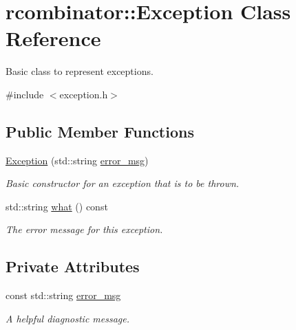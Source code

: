 \hypertarget{classrcombinator_1_1Exception}{}\section{rcombinator\+:\+:Exception Class Reference}
\label{classrcombinator_1_1Exception}


Basic class to represent exceptions.  




{\ttfamily \#include $<$exception.\+h$>$}

\subsection*{Public Member Functions}
\begin{DoxyCompactItemize}
\item 
\mbox{\hyperlink{classrcombinator_1_1Exception_a7d3c8825d7c2d7d1d8c9c537725734de}{Exception}} (std\+::string \mbox{\hyperlink{classrcombinator_1_1Exception_a982a342c7c75134b7323ecd67e43e13d}{error\+\_\+msg}})
\begin{DoxyCompactList}\small\item\em Basic constructor for an exception that is to be thrown. \end{DoxyCompactList}\item 
\mbox{\label{classrcombinator_1_1Exception_ae91e04f748b6e093c7370ed2b1649d07}} 
std\+::string \mbox{\hyperlink{classrcombinator_1_1Exception_ae91e04f748b6e093c7370ed2b1649d07}{what}} () const
\begin{DoxyCompactList}\small\item\em The error message for this exception. \end{DoxyCompactList}\end{DoxyCompactItemize}
\subsection*{Private Attributes}
\begin{DoxyCompactItemize}
\item 
\mbox{\label{classrcombinator_1_1Exception_a982a342c7c75134b7323ecd67e43e13d}} 
const std\+::string \mbox{\hyperlink{classrcombinator_1_1Exception_a982a342c7c75134b7323ecd67e43e13d}{error\+\_\+msg}}
\begin{DoxyCompactList}\small\item\em A helpful diagnostic message. \end{DoxyCompactList}\end{DoxyCompactItemize}


